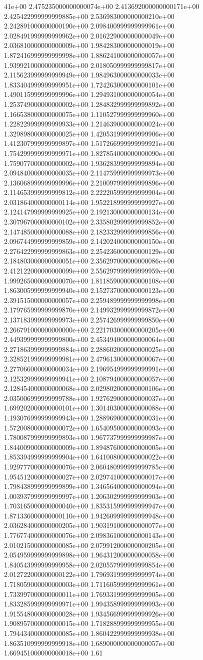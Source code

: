 41e+00	2.475235000000000074e+00	2.413692000000000171e+00	2.425422999999999885e+00	2.536983000000000210e+00	2.242891000000000190e+00	2.098400999999999961e+00	2.028491999999999962e+00	2.016229000000000049e+00	2.036810000000000009e+00	1.984283000000000019e+00	1.872416999999999998e+00	1.886241000000000057e+00	1.939921000000000006e+00	2.018050999999999817e+00	2.115623999999999949e+00	1.984963000000000033e+00	1.833404999999999951e+00	1.724263000000000101e+00	1.490115999999999996e+00	1.294931000000000054e+00	1.253749000000000002e+00	1.284832999999999892e+00	1.166538000000000075e+00	1.110527999999999960e+00	1.228229999999999933e+00	1.214639000000000024e+00	1.329898000000000025e+00	1.420531999999999906e+00	1.412307999999999897e+00	1.517266999999999921e+00	1.754299999999999971e+00	1.827854000000000090e+00	1.759077000000000002e+00	1.936283999999999894e+00	2.094840000000000035e+00	2.114759999999999973e+00	2.136068999999999996e+00	2.210097999999999896e+00	2.114653999999999812e+00	2.222205999999999904e+00	2.031864000000000114e+00	1.952218999999999927e+00	2.124147999999999925e+00	2.192130000000000134e+00	2.307967000000000102e+00	2.335802999999999852e+00	2.147485000000000088e+00	2.182332999999999856e+00	2.096744999999999859e+00	2.142024000000000150e+00	2.276422999999999863e+00	2.254236000000000129e+00	2.184803000000000051e+00	2.356297000000000086e+00	2.412122000000000099e+00	2.556297999999999959e+00	1.999265000000000070e+00	1.811859000000000108e+00	1.863005999999999940e+00	2.152737000000000123e+00	2.391515000000000057e+00	2.259489999999999998e+00	2.179765999999999870e+00	2.149932999999999872e+00	2.137183999999999973e+00	2.257426999999999850e+00	2.266791000000000000e+00	2.221703000000000205e+00	2.449399999999999800e+00	2.453494000000000064e+00	2.271863999999999884e+00	2.288602000000000025e+00	2.328521999999999981e+00	2.479613000000000067e+00	2.277066000000000034e+00	2.196954999999999991e+00	2.125329999999999941e+00	2.108794000000000057e+00	2.128454000000000068e+00	2.029802000000000106e+00	2.035006999999999788e+00	1.927629000000000037e+00	1.699202000000000101e+00	1.301403000000000088e+00	1.193076999999999943e+00	1.288969000000000031e+00	1.572008000000000072e+00	1.654095000000000093e+00	1.780087999999999893e+00	1.967737999999999987e+00	1.844009000000000009e+00	1.894876000000000005e+00	1.853394999999999904e+00	1.641008000000000022e+00	1.929777000000000076e+00	2.060480999999999785e+00	1.954512000000000027e+00	2.029741000000000017e+00	1.798438999999999899e+00	1.346564000000000094e+00	1.003937999999999997e+00	1.206302999999999903e+00	1.703165000000000040e+00	1.835315999999999947e+00	1.871336000000000110e+00	1.942609999999999948e+00	2.036284000000000205e+00	1.903191000000000077e+00	1.776774000000000076e+00	2.098361000000000143e+00	2.010215000000000085e+00	2.079912000000000205e+00	2.054959999999999898e+00	1.964312000000000058e+00	1.840543999999999958e+00	2.020557999999999854e+00	2.012722000000000122e+00	1.796931999999999974e+00	1.718059000000000003e+00	1.711605999999999961e+00	1.733997000000000011e+00	1.769331999999999905e+00	1.833285999999999971e+00	1.994358999999999993e+00	1.915548000000000028e+00	1.934566999999999926e+00	1.908957000000000015e+00	1.718288999999999955e+00	1.794434000000000085e+00	1.860422999999999938e+00	1.863510999999999918e+00	1.689000000000000057e+00	1.669451000000000018e+00	1.61